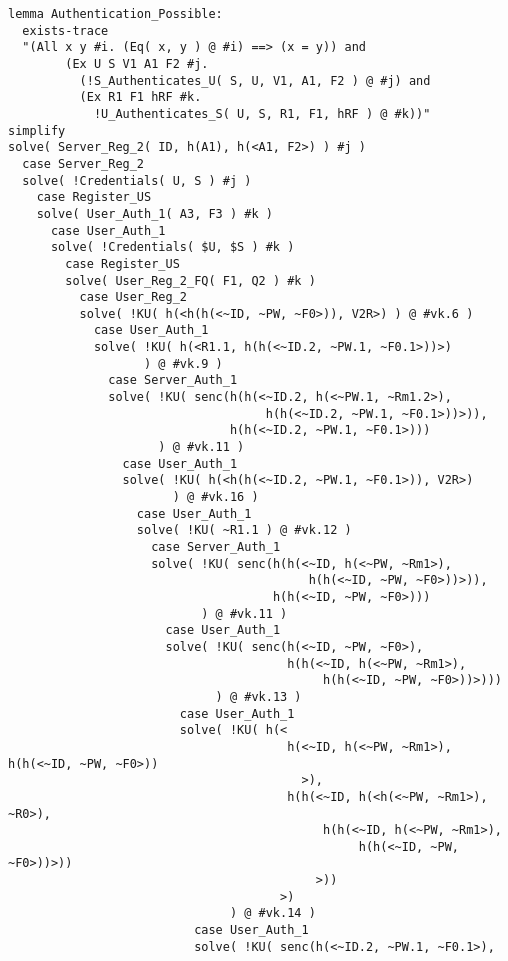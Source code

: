 \documentclass[a4paper, 12pt, titlepage]{article}
\begin{document}
\begin{lstlisting}[caption = Execution results are positive for authentication possible lemma of One Time Password Scheme]
lemma Authentication_Possible:
  exists-trace
  "(All x y #i. (Eq( x, y ) @ #i) ==> (x = y)) and
        (Ex U S V1 A1 F2 #j.
          (!S_Authenticates_U( S, U, V1, A1, F2 ) @ #j) and
          (Ex R1 F1 hRF #k.
            !U_Authenticates_S( U, S, R1, F1, hRF ) @ #k))"
simplify
solve( Server_Reg_2( ID, h(A1), h(<A1, F2>) ) #j )
  case Server_Reg_2
  solve( !Credentials( U, S ) #j )
    case Register_US
    solve( User_Auth_1( A3, F3 ) #k )
      case User_Auth_1
      solve( !Credentials( $U, $S ) #k )
        case Register_US
        solve( User_Reg_2_FQ( F1, Q2 ) #k )
          case User_Reg_2
          solve( !KU( h(<h(h(<~ID, ~PW, ~F0>)), V2R>) ) @ #vk.6 )
            case User_Auth_1
            solve( !KU( h(<R1.1, h(h(<~ID.2, ~PW.1, ~F0.1>))>)
                   ) @ #vk.9 )
              case Server_Auth_1
              solve( !KU( senc(h(h(<~ID.2, h(<~PW.1, ~Rm1.2>),
                                    h(h(<~ID.2, ~PW.1, ~F0.1>))>)),
                               h(h(<~ID.2, ~PW.1, ~F0.1>)))
                     ) @ #vk.11 )
                case User_Auth_1
                solve( !KU( h(<h(h(<~ID.2, ~PW.1, ~F0.1>)), V2R>)
                       ) @ #vk.16 )
                  case User_Auth_1
                  solve( !KU( ~R1.1 ) @ #vk.12 )
                    case Server_Auth_1
                    solve( !KU( senc(h(h(<~ID, h(<~PW, ~Rm1>),
                                          h(h(<~ID, ~PW, ~F0>))>)),
                                     h(h(<~ID, ~PW, ~F0>)))
                           ) @ #vk.11 )
                      case User_Auth_1
                      solve( !KU( senc(h(<~ID, ~PW, ~F0>),
                                       h(h(<~ID, h(<~PW, ~Rm1>),
                                            h(h(<~ID, ~PW, ~F0>))>)))
                             ) @ #vk.13 )
                        case User_Auth_1
                        solve( !KU( h(<
                                       h(<~ID, h(<~PW, ~Rm1>), h(h(<~ID, ~PW, ~F0>))
                                         >),
                                       h(h(<~ID, h(<h(<~PW, ~Rm1>), ~R0>),
                                            h(h(<~ID, h(<~PW, ~Rm1>),
                                                 h(h(<~ID, ~PW, ~F0>))>))
                                           >))
                                      >)
                               ) @ #vk.14 )
                          case User_Auth_1
                          solve( !KU( senc(h(<~ID.2, ~PW.1, ~F0.1>),

\end{lstlisting}
\end{document}
